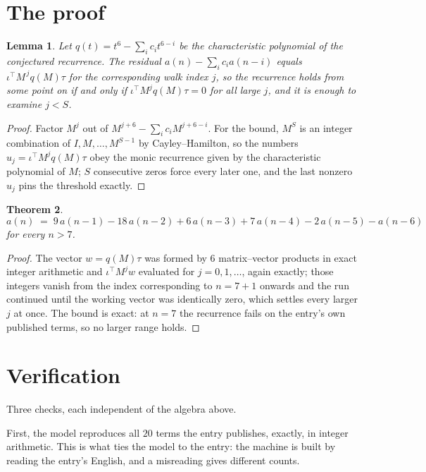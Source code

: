\documentclass[11pt,a4paper]{article}
\theoremstyle{plain}
\newtheorem{theorem}{Theorem}
\newtheorem{lemma}[theorem]{Lemma}
\theoremstyle{definition}
\begin{document}
\section{The proof}

\begin{lemma}\label{lem:crit}
Let $q(t)=t^{6}-\sum_i c_it^{6-i}$ be the characteristic polynomial of the
conjectured recurrence. The residual $a(n)-\sum_ic_ia(n-i)$ equals
$\iota^{\!\top}M^{\,j}q(M)\tau$ for the corresponding walk index $j$, so the recurrence
holds from some point on if and only if $\iota^{\!\top}M^{j}q(M)\tau=0$ for all large $j$,
and it is enough to examine $j<S$.
\end{lemma}

\begin{proof}
Factor $M^{j}$ out of $M^{j+6}-\sum_ic_iM^{j+6-i}$. For the bound, $M^{S}$
is an integer combination of $I,M,\dots,M^{S-1}$ by Cayley--Hamilton, so the numbers
$u_j=\iota^{\!\top}M^{j}q(M)\tau$ obey the monic recurrence given by the characteristic
polynomial of $M$; $S$ consecutive zeros force every later one, and the last nonzero $u_j$
pins the threshold exactly.
\end{proof}

\begin{theorem}
\[
a(n)\;=\;9\,a(n-1) - 18\,a(n-2) + 6\,a(n-3) + 7\,a(n-4) - 2\,a(n-5) - a(n-6)
\]
for every $n>7$.
\end{theorem}

\begin{proof}
The vector $w=q(M)\tau$ was formed by $6$ matrix--vector products in exact integer
arithmetic and $\iota^{\!\top}M^{j}w$ evaluated for $j=0,1,\dots$, again exactly; those
integers vanish from the index corresponding to $n=7+1$ onwards and the run continued
until the working vector was identically zero, which settles every larger $j$ at once. The bound is exact: at $n=7$ the recurrence fails on the entry's own published terms, so no larger range holds.
\end{proof}

\section{Verification}

Three checks, each independent of the algebra above.

First, the model reproduces all $20$ terms the entry publishes, exactly, in integer
arithmetic. This is what ties the model to the entry: the machine is built by reading the
entry's English, and a misreading gives different counts.
\end{document}
